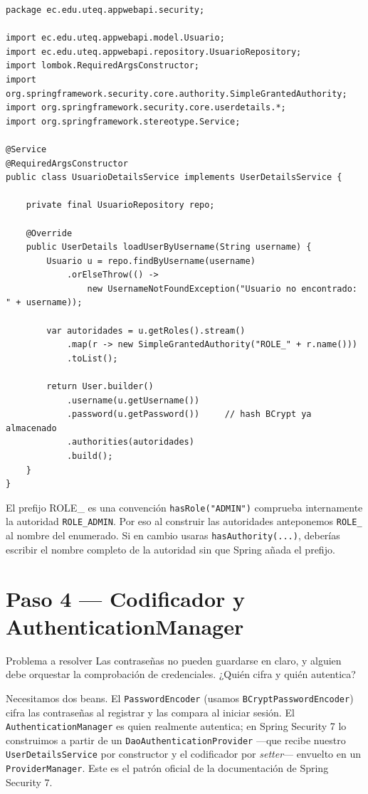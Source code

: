 \documentclass[11pt]{article}
\begin{document}
\begin{cajacodigo}
\begin{lstlisting}[style=java]
package ec.edu.uteq.appwebapi.security;

import ec.edu.uteq.appwebapi.model.Usuario;
import ec.edu.uteq.appwebapi.repository.UsuarioRepository;
import lombok.RequiredArgsConstructor;
import org.springframework.security.core.authority.SimpleGrantedAuthority;
import org.springframework.security.core.userdetails.*;
import org.springframework.stereotype.Service;

@Service
@RequiredArgsConstructor
public class UsuarioDetailsService implements UserDetailsService {

    private final UsuarioRepository repo;

    @Override
    public UserDetails loadUserByUsername(String username) {
        Usuario u = repo.findByUsername(username)
            .orElseThrow(() ->
                new UsernameNotFoundException("Usuario no encontrado: " + username));

        var autoridades = u.getRoles().stream()
            .map(r -> new SimpleGrantedAuthority("ROLE_" + r.name()))
            .toList();

        return User.builder()
            .username(u.getUsername())
            .password(u.getPassword())     // hash BCrypt ya almacenado
            .authorities(autoridades)
            .build();
    }
}
\end{lstlisting}
\end{cajacodigo}

\begin{cajatip}{El prefijo ROLE\_ es una convención}
\texttt{hasRole("ADMIN")} comprueba internamente la autoridad \texttt{ROLE\_ADMIN}. Por eso al construir las autoridades anteponemos \texttt{ROLE\_} al nombre del enumerado. Si en cambio usaras \texttt{hasAuthority(...)}, deberías escribir el nombre completo de la autoridad sin que Spring añada el prefijo.\par
\end{cajatip}

\section{Paso 4 --- Codificador y AuthenticationManager}
\begin{cajaproblema}{Problema a resolver}
Las contraseñas no pueden guardarse en claro, y alguien debe orquestar la comprobación de credenciales. ¿Quién cifra y quién autentica?\par
\end{cajaproblema}
Necesitamos dos beans. El \texttt{PasswordEncoder} (usamos \texttt{BCryptPasswordEncoder}) cifra las contraseñas al registrar y las compara al iniciar sesión. El \texttt{AuthenticationManager} es quien realmente autentica; en Spring Security 7 lo construimos a partir de un \texttt{DaoAuthenticationProvider} ---que recibe nuestro \texttt{UserDetailsService} por constructor y el codificador por \emph{setter}--- envuelto en un \texttt{ProviderManager}. Este es el patrón oficial de la documentación de Spring Security 7.
\end{document}
